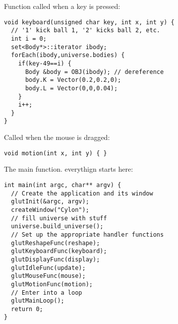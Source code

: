 \noindent
Function called when a key is pressed: \begin{lstlisting}
void keyboard(unsigned char key, int x, int y) {
  // '1' kick ball 1, '2' kicks ball 2, etc.
  int i = 0;
  set<Body*>::iterator ibody;
  forEach(ibody,universe.bodies) {
    if(key-49==i) {
      Body &body = OBJ(ibody); // dereference
      body.K = Vector(0.2,0.2,0);
      body.L = Vector(0,0,0.04);
    }
    i++;
  }
}
\end{lstlisting}
\noindent
Called when the mouse is dragged: \begin{lstlisting}
void motion(int x, int y) { }
\end{lstlisting}
\noindent
The main function. everythign starts here: \begin{lstlisting}
int main(int argc, char** argv) {
  // Create the application and its window
  glutInit(&argc, argv);
  createWindow("Cylon");
  // fill universe with stuff
  universe.build_universe();
  // Set up the appropriate handler functions
  glutReshapeFunc(reshape);
  glutKeyboardFunc(keyboard);
  glutDisplayFunc(display);
  glutIdleFunc(update);
  glutMouseFunc(mouse);
  glutMotionFunc(motion);  
  // Enter into a loop
  glutMainLoop();  
  return 0;
}
\end{lstlisting}
